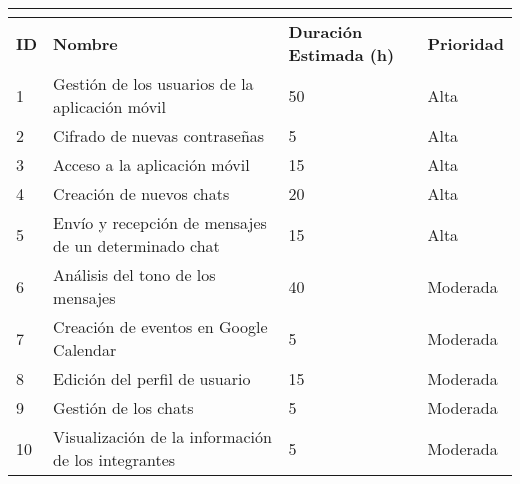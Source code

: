 \begin{tabular}{|l|l|l|l|}
	\hline
	\multicolumn{4}{|c|}{\cellcolor[HTML]{343434}{\color[HTML]{FFFFFF} \textbf{Pila de Producto}}} \\ \hline
	\textbf{ID}              & \textbf{Nombre}              & \textbf{Duración Estimada (h)}             & \textbf{Prioridad}             \\ \hline
	1               & Gestión de los usuarios de la aplicación móvil                   & 50                               & Alta                      \\ \hline
	2               & Cifrado de nuevas contraseñas                    & 5                               & Alta                      \\ \hline
	3               & Acceso a la aplicación móvil                    & 15                               & Alta                      \\ \hline
	4               & Creación de nuevos chats   & 20            & Alta                      \\ \hline
	5               & Envío y recepción de mensajes de un determinado chat                    & 15                     & Alta                      \\ \hline
	6               & Análisis del tono de los mensajes                    & 40                               & Moderada                      \\ \hline
	7               & Creación de eventos en Google Calendar                    & 5                               & Moderada                  \\ \hline
	8               & Edición del perfil de usuario                    & 15                               & Moderada                      \\ \hline
	9               & Gestión de los chats                    & 5                               & Moderada                      \\ \hline
	10               & Visualización de la información de los integrantes           & 5                & Moderada                      \\ \hline
\end{tabular}